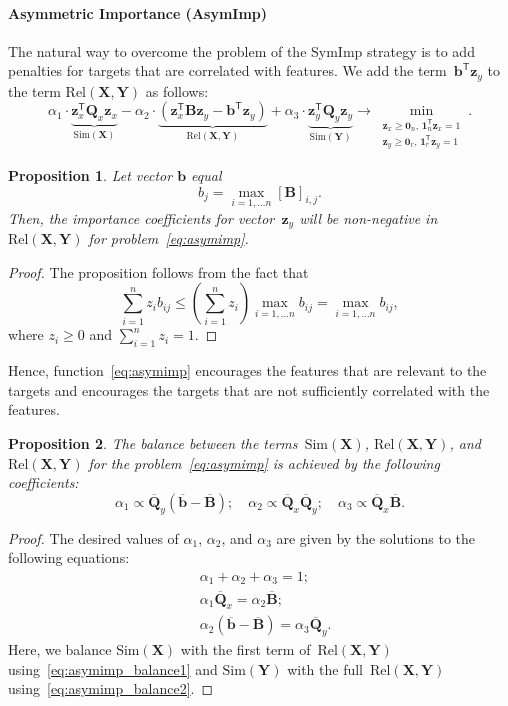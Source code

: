 \documentclass[preprint,authoryear,12pt]{elsarticle}
\newtheorem{proposition}{Proposition}
\theoremstyle{definition}
\newcommand{\bz}{\mathbf{z}}
\newcommand{\bb}{\mathbf{b}}
\newcommand{\bY}{\mathbf{Y}}
\newcommand{\bX}{\mathbf{X}}
\newcommand{\bB}{\mathbf{B}}
\newcommand{\bQ}{\mathbf{Q}}
\newcommand{\T}{\mathsf{T}}
\newcommand{\bOne}{\boldsymbol{1}}
\newcommand{\bZero}{\boldsymbol{0}}
\begin{document}
\paragraph{Asymmetric Importance (AsymImp)}
The natural way to overcome the problem of the SymImp strategy is to add penalties for targets that are correlated with features.
We add the term~$\bb^{\T} \bz_y$ to the term $\text{Rel}(\bX, \bY)$ as follows:
\begin{equation}
\alpha_1 \cdot \underbrace{\bz_x^{\T} \bQ_x \bz_x}_{\text{Sim}(\bX)} - \alpha_2 \cdot  \underbrace{\left(\bz_x^{\T} \bB \bz_y - \bb^{\T} \bz_y \right) }_{\text{Rel}(\bX, \bY)} + \alpha_3 \cdot \underbrace{\bz_y^{\T} \bQ_y \bz_y}_{\text{Sim}(\bY)} \rightarrow \min_{\substack{\bz_x \geq \bZero_n, \, \bOne_n^{\T}\bz_x=1 \\ \bz_y \geq \bZero_r, \, \bOne_r^{\T}\bz_y=1}}.
\label{eq:asymimp}
\end{equation}
\begin{proposition}
	Let vector $\bb$ equal
	\begin{equation*}
	b_j = \max_{i=1, \dots n} [\bB]_{i, j}.
	\end{equation*}
	Then, the importance coefficients for vector~$\bz_y$ will be non-negative in~$\text{Rel}(\bX, \bY)$ for problem~\eqref{eq:asymimp}.
\end{proposition}
\begin{proof}
	The proposition follows from the fact that
	\[
	\sum_{i=1}^n  z_i b_{ij} \leq \left(\sum_{i=1}^n z_i \right)\max_{i=1, \dots n} b_{ij} = \max_{i=1, \dots n} b_{ij},
	\]
	where $z_i \geq 0$ and $\sum_{i=1}^nz_i = 1$.
\end{proof}
Hence, function~\eqref{eq:asymimp} encourages the features that are relevant to the targets and encourages the targets that are not sufficiently correlated with the features. 
\begin{proposition}
	The balance between the terms~$\text{Sim}(\bX)$, $\text{Rel}(\bX, \bY)$, and $\text{Rel}(\bX, \bY)$ for the problem~\eqref{eq:asymimp} is achieved by the following coefficients:
	\begin{equation*}
	\alpha_1 \propto \overline{\bQ}_y \left( \overline{\bb} - \overline{\bB}\right); \quad
	\alpha_2 \propto \overline{\bQ}_x \overline{\bQ}_y; \quad
	\alpha_3  \propto \overline{\bQ}_x \overline{\bB}.
	\end{equation*}
\end{proposition}
\begin{proof}
	The desired values of $\alpha_1$, $\alpha_2$, and $\alpha_3$ are given by the solutions to the following equations:
	\begin{align}
	&\alpha_1 + \alpha_2 + \alpha_3 = 1; \\
	&\alpha_1 \overline{\bQ}_x = \alpha_2 \overline{\bB}; \label{eq:asymimp_balance1}\\
	&\alpha_2 \left(\overline{\bb} - \overline{\bB} \right) = \alpha_3 \overline{\bQ}_y.
	\label{eq:asymimp_balance2}
	\end{align}
	Here, we balance $\text{Sim}(\bX)$ with the first term of~$\text{Rel}(\bX, \bY)$ using~\eqref{eq:asymimp_balance1} and $\text{Sim}(\bY)$ with the full~$\text{Rel}(\bX, \bY)$ using~\eqref{eq:asymimp_balance2}.
\end{proof}
\end{document}

